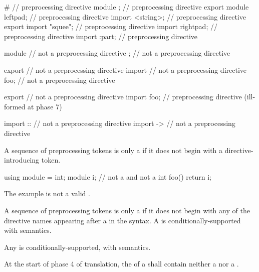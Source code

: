 \begin{example}
\begin{codeblock}
#                       // preprocessing directive
module ;                // preprocessing directive
export module leftpad;  // preprocessing directive
import <string>;        // preprocessing directive
export import "squee";  // preprocessing directive
import rightpad;        // preprocessing directive
import :part;           // preprocessing directive

module                  // not a preprocessing directive
;                       // not a preprocessing directive

export                  // not a preprocessing directive
import                  // not a preprocessing directive
foo;                    // not a preprocessing directive

export                  // not a preprocessing directive
import foo;             // preprocessing directive (ill-formed at phase 7)

import ::               // not a preprocessing directive
import ->               // not a preprocessing directive
\end{codeblock}
\end{example}

\pnum
A sequence of preprocessing tokens is only a 
if it does not begin with a directive-introducing token.
\begin{example}
\begin{codeblock}
using module = int;
module i;               // not a  and not a 
int foo() {
  return i;
}
\end{codeblock}
The example is not a valid .
\end{example}
A sequence of preprocessing tokens is only a 
if it does not begin with any of the directive names
appearing after a \tcode{\#} in the syntax.
A  is
conditionally-supported with
semantics.

\pnum
Any  is conditionally-supported, with
semantics.

\pnum
At the start of phase 4 of translation,
the  of a  shall
contain neither a  nor a .

